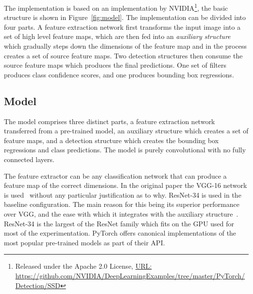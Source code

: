 The implementation is based on an implementation by NVIDIA\footnote{Released under the Apache 2.0 License, \href{https://github.com/NVIDIA/DeepLearningExamples/tree/master/PyTorch/Detection/SSD}{URL:\\ } \url{https://github.com/NVIDIA/DeepLearningExamples/tree/master/PyTorch/Detection/SSD}}, the basic structure is shown in Figure~\ref{fig:model}.
The implementation can be divided into four parts.
A feature extraction network first transforms the input image into a set of high level feature maps, which are then fed into an \textit{auxiliary structure} which gradually steps down the dimensions of the feature map and in the process creates a set of source feature maps.
Two detection structures then consume the source feature maps which produces the final predictions.
One set of filters produces class confidence scores, and one produces bounding box regressions.

\subsection{Model}
The model comprises three distinct parts, a feature extraction network transferred from a pre-trained model, an auxiliary structure which creates a set of feature maps, and a detection structure which creates the bounding box regressions and class predictions.
The model is purely convolutional with no fully connected layers.

The feature extractor can be any classification network that can produce a feature map of the correct dimensions.
In the original paper the VGG-16 network is used\ \parencite{simonyan2015deep} without any particular justification as to why.
ResNet-34 is used in the baseline configuration.
The main reason for this being its superior performance over VGG, and the ease with which it integrates with the auxiliary structure\ \parencite{he2015deep}.
ResNet-34 is the largest of the ResNet family which fits on the GPU used for most of the experimentation.
PyTorch offers canonical implementations of the most popular pre-trained models as part of their API\@.

